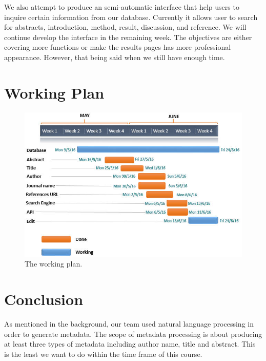 	We also attempt to produce an semi-automatic interface that help users to inquire certain information from our database. 
	Currently it allows user to search for abstracts, introduction, method, result, discussion, and reference. 
	We will continue develop the interface in the remaining week. 
	The objectives are either covering more functions or make the results pages has more professional appearance. 
	However, that being said when we still have enough time.
	
\section*{Working Plan}

\begin{figure}[tbh]
	\begin{center}
		\includegraphics[width=\columnwidth]{Union_Result_Chart_working plan}
	\end{center}
	\caption{The working plan.}
	\end{figure}
	
\section*{Conclusion}
As mentioned in the background, our team used natural language processing in order to generate metadata. 
The scope of metadata processing is about producing at least three types of metadata including author name, title and abstract. 
This is the least we want to do within the time frame of this course. 

